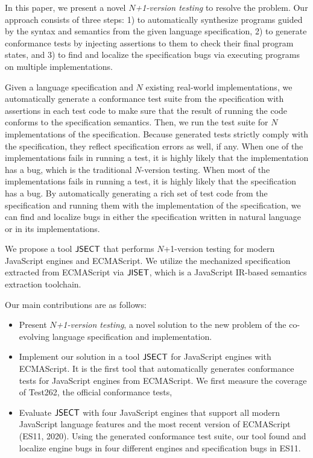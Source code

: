 In this paper, we present a novel \textit{$N$+1-version testing} to resolve the
problem. Our approach consists of three steps: 1) to automatically synthesize
programs guided by the syntax and semantics from the given language
specification, 2) to generate conformance tests by injecting assertions to them
to check their final program states, and 3) to find and localize the
specification bugs via executing programs on multiple implementations.

Given a language specification and $N$ existing real-world implementations, we
automatically generate a conformance test suite from the specification with
assertions in each test code to make sure that the result of running the code
conforms to the specification semantics.  Then, we run the test suite for $N$
implementations of the specification. Because generated tests strictly comply
with the specification, they reflect specification errors as well, if any.  When
one of the implementations fails in running a test, it is highly likely that the
implementation has a bug, which is the traditional $N$-version testing. When
most of the implementations fails in running a test, it is highly likely that
the specification has a bug.  By automatically generating a rich set of test
code from the specification and running them with the implementation of the
specification, we can find and localize bugs in either the specification written
in natural language or in its implementations.

We propose a tool $\text{\sf JSECT}$ that performs $N$+1-version testing for modern
JavaScript engines and ECMAScript.  We utilize the mechanized specification
extracted from ECMAScript via $\text{\sf JISET}$\cite{jiset}, which is a JavaScript
IR-based semantics extraction toolchain.

Our main contributions are as follows:
\begin{itemize}
  \item Present \textit{$N$+1-version testing}, a novel solution to the new
    problem of the co-evolving language specification and implementation.
  \item Implement our solution in a tool $\text{\sf JSECT}$ for JavaScript engines with
    ECMAScript.  It is the first tool that automatically generates conformance
    tests for JavaScript engines from ECMAScript.  We first measure the coverage
    of Test262, the official conformance tests, 
  \item Evaluate $\text{\sf JSECT}$ with four JavaScript engines that support all modern
    JavaScript language features and the most recent version of ECMAScript
    (ES11, 2020).  Using the generated conformance test suite, our tool found
    and localize  engine bugs in four different engines and 
    specification bugs in ES11.
\end{itemize}
